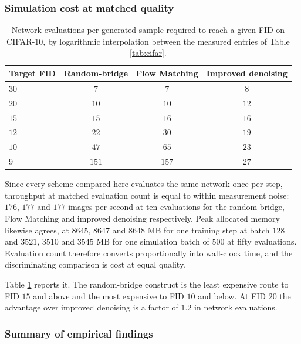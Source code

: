 \subsubsection*{Simulation cost at matched quality}
\label{sec:gausscost}

\begin{table}[htbp]
\begin{center}
\caption{Network evaluations per generated sample required to reach a given FID
on CIFAR-10, by logarithmic interpolation between the measured entries of Table
\ref{tab:cifar}.}
\label{tab:cost}
\vskip 0.1in
\begin{tabular}{lccc}
\toprule
Target FID & Random-bridge & Flow Matching & Improved denoising \\
\midrule
$30$ & $7$   & $7$   & $8$  \\
$20$ & $10$  & $10$  & $12$ \\
$15$ & $15$  & $16$  & $16$ \\
$12$ & $22$  & $30$  & $19$ \\
$10$ & $47$  & $65$  & $23$ \\
$9$  & $151$ & $157$ & $27$ \\
\bottomrule
\end{tabular}
\end{center}
\end{table}

Since every scheme compared here evaluates the same network once per step,
throughput at matched evaluation count is equal to within measurement noise:
$176$, $177$ and $177$ images per second at ten evaluations for the
random-bridge, Flow Matching and improved denoising respectively. Peak allocated
memory likewise agrees, at $8645$, $8647$ and $8648$ MB for one training step at
batch $128$ and $3521$, $3510$ and $3545$ MB for one simulation batch of $500$ at
fifty evaluations. Evaluation count therefore converts proportionally into
wall-clock time, and the discriminating comparison is cost at equal quality.

Table \ref{tab:cost} reports it. The random-bridge construct is the least
expensive route to FID $15$ and above and the most expensive to FID $10$ and
below. At FID $20$ the advantage over improved denoising is a factor of $1.2$ in
network evaluations.

\subsubsection*{Summary of empirical findings}
\label{sec:gaussclaims}

